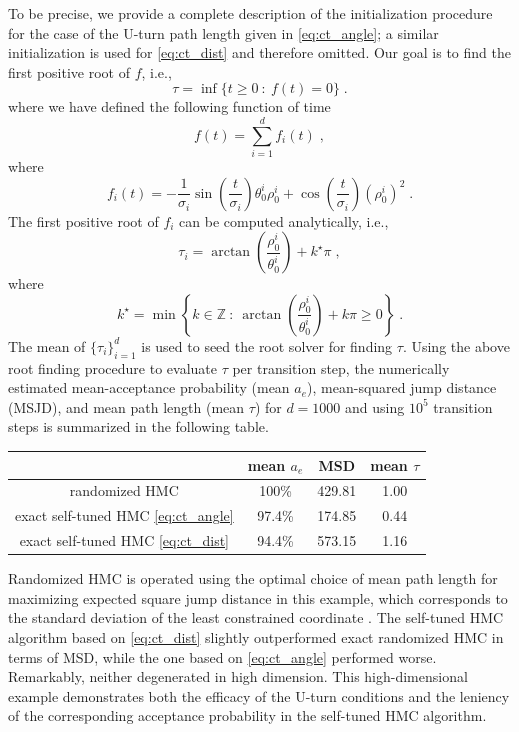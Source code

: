 \documentclass[letterpaper,11pt]{article}
\theoremstyle{plain}%
\theoremstyle{remark}
\begin{document}
To be precise, we provide a complete description of the initialization procedure for the case of the U-turn path length given in \eqref{eq:ct_angle}; a similar initialization is used for \eqref{eq:ct_dist} and therefore omitted.  Our goal is to find the first positive root of $f$, i.e., 
\[
\tau = \inf\{ t \ge 0 ~:~ f(t) = 0 \} \;.
\] 
where we have defined the following function of time  
\[
f(t) = \sum_{i=1}^d f_i(t) \;,
\]
where
\[
f_i(t) = -\frac{1}{\sigma_i} \sin\left( \frac{t}{\sigma_i} \right)  \theta_0^i \rho_0^i + \cos\left( \frac{t}{\sigma_i} \right) (\rho_0^i)^2 \;. 
\]
The first positive root of $f_i$ can be computed analytically, i.e., 
\[
 \tau_i = \arctan\left( \frac{\rho^i_0}{\theta^i_0} \right)  + k^{\star} \pi \;,  
\] 
where
\[
k^{\star} = \min\left\{ k \in \mathbb{Z} ~:~ \arctan\left( \frac{\rho^i_0}{\theta^i_0} \right)  + k \pi \ge 0  \right\} \;. 
\]
The mean of $\{ \tau_i \}_{i=1}^d$ is used to seed the root solver for finding $\tau$.     
Using the above root finding procedure to evaluate $\tau$ per transition step, the numerically estimated mean-acceptance probability (mean $a_e$),  mean-squared jump distance (MSJD), and mean path length (mean $\tau$) for $d=1000$ and using $10^5$ transition steps is summarized in the following table.  
\begin{center}
\begin{tabular}{c|c|c|c}
& mean $a_e$ & MSD & mean $\tau$ \\
\hline
randomized HMC & 100\% & 429.81 & 1.00 \\
exact self-tuned HMC \eqref{eq:ct_angle} & 97.4\% & 174.85 &  0.44 \\
exact self-tuned HMC \eqref{eq:ct_dist} & 94.4\%  & 573.15 &  1.16
\end{tabular}
\end{center}
Randomized HMC is operated using the optimal choice of mean path length for maximizing expected square jump distance in this example, which corresponds to the standard deviation of the least constrained coordinate \cite[Section 4]{BoSa2017}.  The self-tuned HMC algorithm based on \eqref{eq:ct_dist} slightly outperformed exact randomized HMC in terms of MSD, while the one based on \eqref{eq:ct_angle} performed worse.  Remarkably, neither degenerated in high dimension.  This high-dimensional example demonstrates both the efficacy of the U-turn conditions and the leniency of the corresponding acceptance probability in the self-tuned HMC algorithm.  
\end{document}
